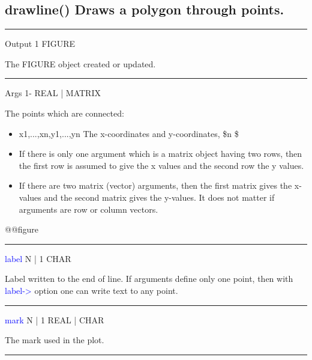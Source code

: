 \subsection{\textcolor{VioletRed}{drawline}() Draws a polygon through points.}
\label{drawline}
\vspace{0.3cm}
\hrule
\vspace{0.3cm}
\noindent Output  \tabto{3cm}  1 \tabto{5cm}   FIGURE  \tabto{7cm}
\begin{changemargin}{3cm}{0cm}
\noindent  The FIGURE object created or updated.
\end{changemargin}
\vspace{0.3cm}
\hrule
\vspace{0.3cm}
\noindent Args \tabto{3cm} 1-  \tabto{5cm}  REAL | MATRIX  \tabto{7cm}
\begin{changemargin}{3cm}{0cm}
\noindent  The points which are connected:
\begin{itemize}
\item  x1,...,xn,y1,...,yn The x-coordinates and y-coordinates,
\$n \$
\item   If there is only one argument which is a
matrix object having two rows, then the first row is assumed to give the x values
and the second row the y values.
\item   If there are two matrix (vector) arguments, then
the first matrix gives the x-values and the second matrix gives the y-values.
It does not matter if arguments are row or column vectors.
\end{itemize}
@@figure
\end{changemargin}
\vspace{0.3cm}
\hrule
\vspace{0.3cm}
\noindent \textcolor{blue}{label}  \tabto{3cm}  N | 1  \tabto{5cm}   CHAR  \tabto{7cm}
\begin{changemargin}{3cm}{0cm}
\noindent  Label written to the end of line. If arguments define only one point,
then with \textcolor{blue}{label->} option one can write text to any point.
\end{changemargin}
\vspace{0.3cm}
\hrule
\vspace{0.3cm}
\noindent \textcolor{blue}{mark}  \tabto{3cm}  N | 1  \tabto{5cm}   REAL | CHAR  \tabto{7cm}
\begin{changemargin}{3cm}{0cm}
\noindent  The mark used in the plot.
\end{changemargin}
\vspace{0.3cm}
\hrule
